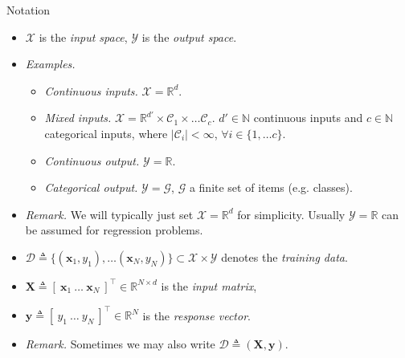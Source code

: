 \documentclass{beamer}
\numberwithin{equation}{section}
\begin{document}
\begin{frame}{Notation}
    \begin{itemize}
        \item
        $ \mathcal{X} $ is the \textit{input space}, $ \mathcal{Y} $ is the 
        \textit{output space}.

        \item
        \textit{Examples.}
        \begin{itemize}
            \item
            \textit{Continuous inputs.} $ \mathcal{X} = \mathbb{R}^d $.

            \item
            \textit{Mixed inputs.} $ \mathcal{X} = \mathbb{R}^{d'} \times
            \mathcal{C}_1 \times \ldots \mathcal{C}_c $. $ d' \in \mathbb{N} $
            continuous inputs and $ c \in \mathbb{N} $ categorical inputs,
            where $ |\mathcal{C}_i| < \infty $, $ \forall i \in
            \{1, \ldots c\} $. 

            \item
            \textit{Continuous output.} $ \mathcal{Y} = \mathbb{R} $.

            \item
            \textit{Categorical output.} $ \mathcal{Y} = \mathcal{G} $,
            $ \mathcal{G} $ a finite set of items (e.g. classes).
        \end{itemize}

        \item
        \textit{Remark.} We will typically just set $ \mathcal{X} =
        \mathbb{R}^d $ for simplicity. Usually $ \mathcal{Y} = \mathbb{R} $
        can be assumed for regression problems.

        \item
        $ \mathcal{D} \triangleq \{(\mathbf{x}_1, y_1), \ldots
        (\mathbf{x}_N, y_N)\} \subset \mathcal{X} \times \mathcal{Y} $ denotes
        the \textit{training data}.

        \item
        $ \mathbf{X} \triangleq [ \ \mathbf{x}_1 \ \ldots \
        \mathbf{x}_N \ ]^\top \in \mathbb{R}^{N \times d} $ is the
        \textit{input matrix},

        \item
        $ \mathbf{y} \triangleq [ \ y_1 \ \ldots \ y_N \ ]^\top \in
        \mathbb{R}^N $ is the \textit{response vector}.

        \item
        \textit{Remark.} Sometimes we may also write $ \mathcal{D} \triangleq
        (\mathbf{X}, \mathbf{y}) $.
    \end{itemize}
\end{frame}
\end{document}
